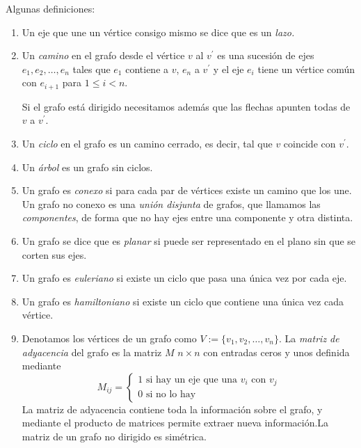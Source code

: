 {\sc Algunas definiciones:}
\begin{enumerate}
 \item Un eje que une un v\'ertice consigo mismo se dice que es un {\itshape 
lazo.}
 
 \item Un {\itshape camino} en el grafo desde el v\'ertice $v$ al $v^{\prime}$ 
es una sucesi\'on de ejes $e_1,e_2,\dots,e_n$ tales que $e_1$ contiene a $v$, 
$e_n$ a $v^{\prime}$ y el eje $e_i$ tiene un v\'ertice com\'un con $e_{i+1}$ 
para $1\le i<n$. 

Si el grafo est\'a dirigido necesitamos adem\'as que las flechas apunten todas 
de $v$ a $v^{\prime}.$

\item Un {\itshape ciclo} en el grafo es un camino cerrado, es decir,  tal que 
$v$ coincide con $v^{\prime}.$

\item Un {\itshape \'arbol} es un grafo sin ciclos. 

\item Un grafo es {\itshape conexo} si para cada par de v\'ertices existe un 
camino que los une. Un grafo no conexo es una {\itshape uni\'on disjunta} de 
grafos,  que llamamos las {\itshape componentes}, de forma que no hay ejes 
entre una componente y otra distinta. 
 
 \item Un grafo se dice que es {\itshape planar} si puede ser representado en 
el plano sin que se corten sus ejes. 
 
 \item Un grafo es {\itshape euleriano} si existe un ciclo que pasa una \'unica 
vez por cada eje.
 
 \item Un grafo es {\itshape hamiltoniano} si existe un ciclo que contiene una 
\'unica vez cada v\'ertice. 
 
 \item Denotamos los v\'ertices de un grafo como $V:=\{v_1,v_2,\dots,v_n\}$. La 
{\itshape matriz de adyacencia} del grafo es la matriz $M$  $n\times n$ con 
entradas ceros y unos definida mediante 
\[M_{ij}=
 \begin{cases}
  1 \text{ si hay un eje que una $v_i$ con $v_j$}\\
  0 \text{ si no lo hay}
 \end{cases}
\]
 La matriz de adyacencia contiene toda la informaci\'on sobre el grafo, y 
mediante el producto de matrices permite extraer nueva informaci\'on.La matriz 
de un grafo no dirigido es sim\'etrica.
 

\end{enumerate}
